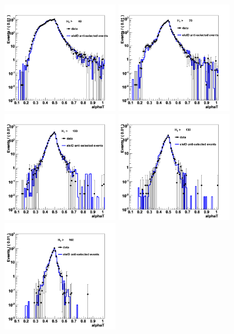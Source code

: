 \begin{figure}[h!]

\includegraphics[width=50mm]{Plots/w-alphaT-1}
\includegraphics[width=50mm]{Plots/w-alphaT-2}
\includegraphics[width=50mm]{Plots/w-alphaT-3}
\includegraphics[width=50mm]{Plots/w-alphaT-4}
\hspace*{3mm}
\includegraphics[width=50mm]{Plots/w-alphaT-5}

\end{figure}
